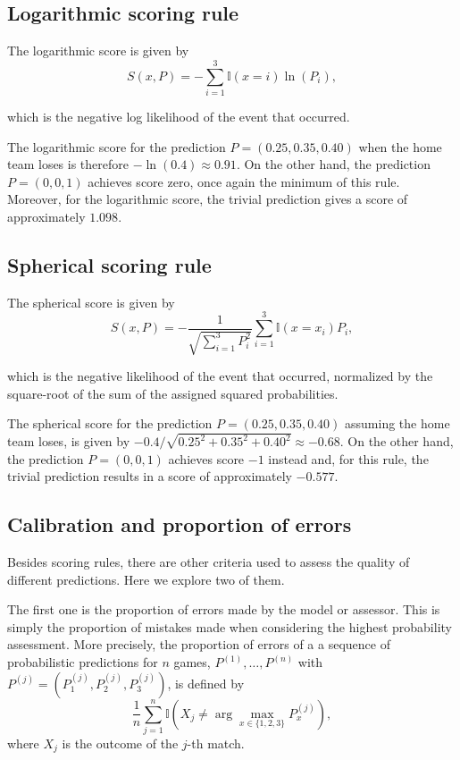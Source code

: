 \documentclass[journal,article,accept,moreauthors,pdftex,12pt,a4paper]{mdpi}
\begin{document}


    \subsection{Logarithmic scoring rule}

    The logarithmic  score is given by
    $$S(x,P)=- \sum_{i=1}^3\mathbb{I}(x=i)\ln(P_i),$$

    \noindent
    which is the negative log likelihood of the event that occurred.

    The logarithmic score for the prediction
    $P=(0.25,0.35,0.40)$
         when the home team loses is therefore
    $-\ln(0.4)\approx 0.91$.
    On the other hand, the prediction $P=(0,0,1)$ achieves score zero, once again the minimum of this rule.
    Moreover, for the logarithmic score, the trivial prediction gives a score of approximately $1.098$.

    \subsection{Spherical scoring rule}

    The spherical score is given by
    $$S(x,P)=- \frac{1}{\sqrt{\sum_{i=1}^3 P^2_i}}\sum_{i=1}^3\mathbb{I}(x=x_i)P_i,$$

    \noindent
    which is the negative likelihood of the event that occurred, normalized by the square-root of the sum of the assigned squared probabilities.

    The spherical score for the prediction
        $P=(0.25,0.35,0.40)$ assuming the home team loses, is given by
    $-0.4/\sqrt{0.25^2+0.35^2+0.40^2} \approx -0.68$.
    On the other hand, the prediction $P=(0,0,1)$ achieves score  $-1$ instead and, for this rule, the trivial prediction results in a score of approximately $-0.577$.

    \subsection{Calibration and proportion of errors}
    \label{sec::calib}

    Besides scoring rules, there are other criteria used to assess the quality of different predictions. Here we explore two of them.

    The first one is the proportion of errors made by the model or assessor. This is simply the proportion of mistakes made when considering the highest probability assessment.
    More precisely, the proportion of errors of a a sequence of probabilistic predictions for $n$ games, $P^{(1)},\ldots,P^{(n)}$
    with
        $P^{(j)}=(P^{(j)}_1,P^{(j)}_2,P^{(j)}_3)$, is defined by
    $$\frac{1}{n}\sum_{j=1}^n \mathbb{I}\left(X_j \neq \arg \max_{x \in \{1,2,3\}} P^{(j)}_x\right),$$
    where $X_j$ is the outcome of the $j$-th match.
\end{document}
